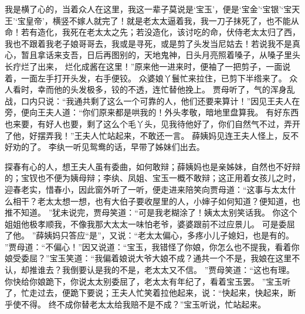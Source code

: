 我是横了心的，当着众人在这里，我这一辈子莫说是‘宝玉’，便是‘宝金’‘宝银’‘宝天王’‘宝皇帝’，横竖不嫁人就完了！就是老太太逼着我，我一刀子抹死了，也不能从命！若有造化，我死在老太太之先；若没造化，该讨吃的命，伏侍老太太归了西，我也不跟着我老子娘哥哥去，我或是寻死，或是剪了头发当尼姑去！若说我不是真心，暂且拿话来支吾，日后再图别的，天地鬼神，日头月亮照着嗓子，从嗓子里头长疔烂了出来，
烂化成酱在这里！”原来他一进来时，便袖了一把剪子，一面说着，一面左手打开头发，右手便铰。
众婆娘丫鬟忙来拉住，已剪下半绺来了。
众人看时，幸而他的头发极多，铰的不透，连忙替他挽上。
贾母听了，气的浑身乱战，口内只说：“我通共剩了这么一个可靠的人，他们还要来算计！”因见王夫人在旁，便向王夫人道：“你们原来都是哄我的！外头孝敬，暗地里盘算我。
有好东西也来要，有好人也要，剩了这么个毛丫头，见我待他好了，你们自然气不过，弄开了他，好摆弄我！”王夫人忙站起来，不敢还一言。
薛姨妈见连王夫人怪上，反不好劝的了。
李纨一听见鸳鸯的话，早带了姊妹们出去。
\par
探春有心的人，想王夫人虽有委曲，如何敢辩；薛姨妈也是亲姊妹，自然也不好辩的；宝钗也不便为姨母辩；李纨、凤姐、宝玉一概不敢辩；这正用着女孩儿之时，迎春老实，惜春小，因此窗外听了一听，便走进来陪笑向贾母道：“这事与太太什么相干？老太太想一想，也有大伯子要收屋里的人，小婶子如何知道？便知道，也推不知道。
”犹未说完，贾母笑道：“可是我老糊涂了！姨太太别笑话我。
你这个姐姐他极孝顺我，不像我那大太太一味怕老爷，婆婆跟前不过应景儿。
可是委屈了他。
”薛姨妈只答应“是”，又说：“老太太偏心，多疼小儿子媳妇，也是有的。
”贾母道：“不偏心！”因又说道：“宝玉，我错怪了你娘，你怎么也不提我，看着你娘受委屈？”宝玉笑道：“我偏着娘说大爷大娘不成？通共一个不是，我娘在这里不认，却推谁去？我倒要认是我的不是，老太太又不信。
”贾母笑道：“这也有理。
你快给你娘跪下，你说太太别委屈了，老太太有年纪了，看着宝玉罢。
”宝玉听了，忙走过去，便跪下要说；王夫人忙笑着拉他起来，说：“快起来，快起来，断乎使不得。
终不成你替老太太给我赔不是不成？”宝玉听说，忙站起来。
